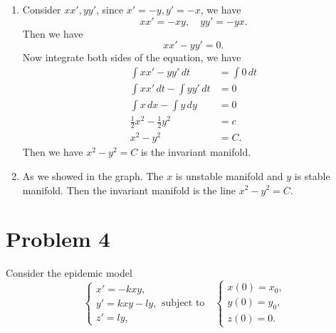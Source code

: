 \documentclass[12pt]{exam}
\begin{document}
\begin{enumerate}
		
	\item Consider $xx', yy'$, since $x'=-y, y'=-x$, we have
		\[xx' = -xy, \quad yy' = -yx.\]
		Then we have
		\[xx'-yy' = 0.\]
		Now integrate both sides of the equation, we have	
		\begin{align*}
			\int xx'-yy' \, dt &= \int 0 \, dt \\
			\int xx' \, dt - \int yy' \, dt &= 0 \\
			\int x \, dx - \int y \, dy &= 0 \\
			\frac{1}{2}x^2 - \frac{1}{2}y^2 &= c \\
			x^2 - y^2 &= C.
		\end{align*}
		Then we have $x^2-y^2=C$ is the invariant manifold.
		

	\item As we showed in the graph. The $x$ is unstable manifold and $y$ is stable manifold. Then the invariant manifold is the line $x^2-y^2=C$.

\end{enumerate}


\section*{Problem 4}
Consider the epidemic model
\[\begin{cases}
	x' = -kxy, \\
	y' = kxy-ly, \\
	z' = ly,
\end{cases}
\text{subject to} \quad 
\begin{cases}
	x(0) = x_0, \\
	y(0) = y_0, \\
	z(0) = 0.
\end{cases}\]
\end{document}
